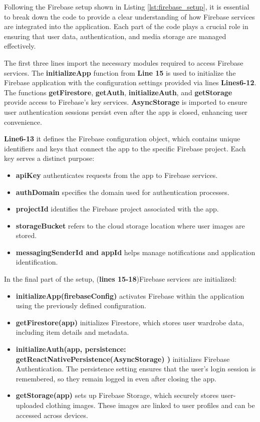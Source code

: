 Following the Firebase setup shown in Listing \ref{lst:firebase_setup}, it is essential to break down the code to provide a clear understanding of how Firebase services are integrated into the application. Each part of the code plays a crucial role in ensuring that user data, authentication, and media storage are managed effectively.

The first three lines import the necessary modules required to access Firebase services. The \textbf{initializeApp} function from  \textbf{Line 15} is used to initialize the Firebase application with the configuration settings provided via lines  \textbf{Lines6-12}. The functions \textbf{getFirestore}, \textbf{getAuth}, \textbf{initializeAuth}, and \textbf{getStorage} provide access to Firebase's key services. \textbf{AsyncStorage} is imported to ensure user authentication sessions persist even after the app is closed, enhancing user convenience.

 \textbf{Line6-13} it defines the Firebase configuration object, which contains unique identifiers and keys that connect the app to the specific Firebase project. Each key serves a distinct purpose:
\begin{itemize}
\item \textbf{apiKey} authenticates requests from the app to Firebase services.
\item \textbf{authDomain} specifies the domain used for authentication processes.
\item \textbf{projectId} identifies the Firebase project associated with the app.
\item \textbf{storageBucket} refers to the cloud storage location where user images are stored.
\item \textbf{messagingSenderId and appId} helps manage notifications and application identification.
\end{itemize}

In the final part of the setup, (\textbf{lines 15-18})Firebase services are initialized:

\begin{itemize}
\item \textbf{initializeApp(firebaseConfig)} activates Firebase within the application using the previously defined configuration.
\item \textbf {getFirestore(app)} initializes Firestore, which stores user wardrobe data, including item details and metadata.
\item \textbf {initializeAuth(app, {persistence: getReactNativePersistence(AsyncStorage) })} initializes Firebase Authentication. The persistence setting ensures that the user's login session is remembered, so they remain logged in even after closing the app.
\item \textbf {getStorage(app)} sets up Firebase Storage, which securely stores user-uploaded clothing images. These images are linked to user profiles and can be accessed across devices.
\end{itemize}

